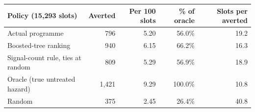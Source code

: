 \setlength{\tabcolsep}{5pt}\begin{tabular}{@{}lrrrr@{}}\toprule
Policy (15,293 slots) & Averted & Per 100 slots & \% of oracle & Slots per averted \\
\midrule
Actual programme & 796 & 5.20 & 56.0\% & 19.2 \\
Boosted-tree ranking & 940 & 6.15 & 66.2\% & 16.3 \\
Signal-count rule, ties at random & 809 & 5.29 & 56.9\% & 18.9 \\
Oracle (true untreated hazard) & 1,421 & 9.29 & 100.0\% & 10.8 \\
Random & 375 & 2.45 & 26.4\% & 40.8 \\
\bottomrule
\end{tabular}
